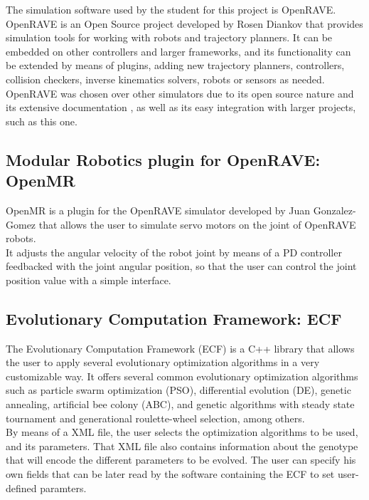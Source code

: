 The simulation software used by the student for this project is OpenRAVE. OpenRAVE \cite{diankov_thesis} is an Open Source project developed by Rosen Diankov that provides simulation tools for working with robots and trajectory planners. It can be embedded on other controllers and larger frameworks, and its functionality can be extended by means of plugins, adding new trajectory planners, controllers, collision checkers, inverse kinematics solvers, robots or sensors as needed.\\

OpenRAVE was chosen over other simulators due to its open source nature and its extensive documentation \cite{diankov_website:openrave}, as well as its easy integration with larger projects, such as this one.

\subsection{Modular Robotics plugin for OpenRAVE: OpenMR}
\label{software_openMR}

OpenMR \cite{gonzalez-gomez_website:openmr} is a plugin for the OpenRAVE simulator developed by Juan Gonzalez-Gomez that allows the user to simulate servo motors on the joint of OpenRAVE robots.\\

It adjusts the angular velocity of the robot joint by means of a PD controller feedbacked with the joint angular position, so that the user can control the joint position value with a simple interface.

\subsection{Evolutionary Computation Framework: ECF}
\label{software_ECF}

The Evolutionary Computation Framework (ECF) \cite{ecf:website} is a C++ library that allows the user to apply several evolutionary optimization algorithms in a very customizable way. It offers several common evolutionary optimization algorithms such as particle swarm optimization (PSO), differential evolution (DE), genetic annealing, artificial bee colony (ABC), and genetic algorithms with steady state tournament and generational roulette-wheel selection, among others.\\

By means of a XML file, the user selects the optimization algorithms to be used, and its parameters. That XML file also contains information about the genotype that will encode the different parameters to be evolved. The user can specify his own fields that can be later read by the software containing the ECF to set user-defined paramters.\\

